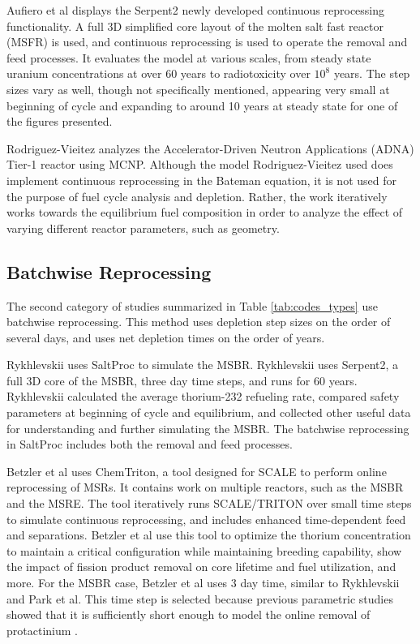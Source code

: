 Aufiero et al \cite{aufiero_extended_2013} displays the Serpent2 newly developed continuous reprocessing functionality. A full 3D simplified core layout of the molten salt fast reactor (MSFR) is used, and continuous reprocessing is used to operate the removal and feed processes. It evaluates the model at various scales, from steady state uranium concentrations at over 60 years to radiotoxicity over $10^8$ years. The step sizes vary as well, though not specifically mentioned, appearing very small at beginning of cycle and expanding to around 10 years at steady state for one of the figures presented.

Rodriguez-Vieitez \cite{rodriguez-vieitez_transmutation_2002} analyzes the Accelerator-Driven Neutron Applications (ADNA) Tier-1 reactor using MCNP. Although the model Rodriguez-Vieitez used does implement continuous reprocessing in the Bateman equation, it is not used for the purpose of fuel cycle analysis and depletion. Rather, the work iteratively works towards the equilibrium fuel composition in order to analyze the effect of varying different reactor parameters, such as geometry.

\subsection{Batchwise Reprocessing}
\label{litrev-msr-batchwise}

The second category of studies summarized in Table \ref{tab:codes_types} use batchwise reprocessing. This method uses depletion step sizes on the order of several days, and uses net depletion times on the order of years.

Rykhlevskii \cite{rykhlevskii_modeling_2019} uses SaltProc to simulate the MSBR. Rykhlevskii uses Serpent2, a full 3D core of the MSBR, three day time steps, and runs for 60 years.
Rykhlevskii calculated the average thorium-232 refueling rate, compared safety parameters at beginning of cycle and equilibrium, and collected other useful data for understanding and further simulating the MSBR.
The batchwise reprocessing in SaltProc includes both the removal and feed processes.

Betzler et al \cite{betzler_molten_2017} uses ChemTriton, a tool designed for SCALE to perform online reprocessing of MSRs. It contains work on multiple reactors, such as the MSBR and the MSRE. The tool iteratively runs SCALE/TRITON over small time steps to simulate continuous reprocessing, and includes enhanced time-dependent feed and separations.
Betzler et al use this tool to optimize the thorium concentration to maintain a critical configuration while maintaining breeding capability, show the impact of fission product removal on core lifetime and fuel utilization, and more.
For the MSBR case, Betzler et al uses 3 day time, similar to Rykhlevskii and Park et al.
This time step is selected because previous parametric studies showed that it is sufficiently short enough to model the online removal of protactinium \cite{powers_new_2013}.

